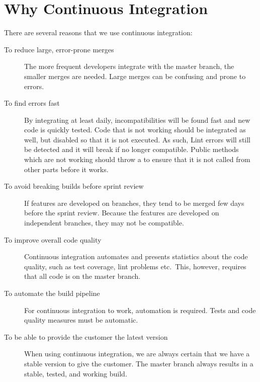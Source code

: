 \section{Why Continuous Integration}
There are several reasons that we use continuous integration:
\begin{description}
  \item[To reduce large, error-prone merges] The more frequent developers integrate with the master branch, the smaller merges are needed. Large merges can be confusing and prone to errors.
  \item[To find errors fast] By integrating at least daily, incompatibilities will be found fast and new code is quickly tested. Code that is not working should be integrated as well, but disabled so that it is not executed. As such, Lint errors will still be detected and it will break if no longer compatible. Public methods which are not working should throw a  to ensure that it is not called from other parts before it works.
  \item[To avoid breaking builds before sprint review] If features are developed on branches, they tend to be merged few days before the sprint review. Because the features are developed on independent branches, they may not be compatible.
  \item[To improve overall code quality] Continuous integration automates and presents statistics about the code quality, such as test coverage, lint problems etc.\ This, however, requires that all code is on the master branch.
  \item[To automate the build pipeline] For continuous integration to work, automation is required. Tests and code quality measures must be automatic.
  \item[To be able to provide the customer the latest version] When using continuous integration, we are always certain that we have a stable version to give the customer. The master branch always results in a stable, tested, and working build.
\end{description}